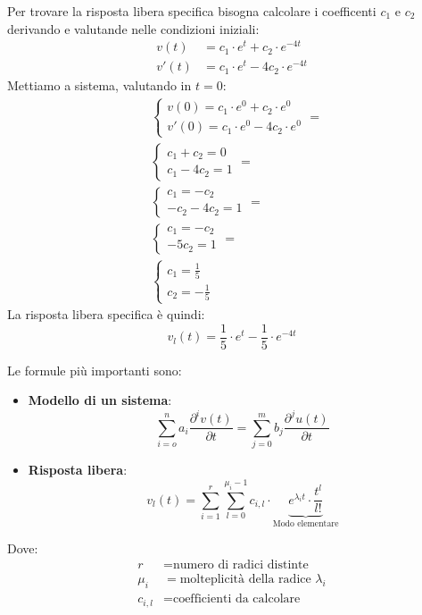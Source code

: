 \documentclass[a4paper]{article}
\begin{document}
\begin{example}
  \vspace{1em}
  \noindent
  Per trovare la risposta libera specifica bisogna calcolare i coefficenti \( c_1 \) e \( c_2 \)
  derivando e valutande nelle condizioni iniziali:
  \[
    \begin{aligned}
      v(t)  &= c_1 \cdot e^{t} + c_2 \cdot e^{-4t}\\
      v'(t) &= c_1 \cdot e^{t} - 4c_2 \cdot e^{-4t}
  \end{aligned}
  \] 
  Mettiamo a sistema, valutando in \( t = 0 \):
  \[
    \begin{aligned}
      &\begin{cases}
        v(0) = c_1 \cdot e^0 + c_2 \cdot e^0\\
        v'(0) = c_1 \cdot e^0 - 4c_2 \cdot e^0
      \end{cases}
      =\\
      &\begin{cases}
        c_1 + c_2 = 0\\
        c_1 - 4c_2 = 1
      \end{cases}
      =\\
      &\begin{cases}
        c_1 = -c_2\\
        -c_2 - 4c_2 = 1
      \end{cases}
      =\\
      &\begin{cases}
        c_1 = -c_2\\
        -5c_2 = 1
      \end{cases}
      =\\
      &\begin{cases}
        c_1 = \frac{1}{5}\\
        c_2 = -\frac{1}{5}
      \end{cases}
    \end{aligned}
  \] 
  La risposta libera specifica è quindi:
  \[
    v_l(t) = \frac{1}{5} \cdot e^t - \frac{1}{5} \cdot e^{-4t}
  \] 
\end{example}

\begin{definition}
  Le formule più importanti sono:
  \begin{itemize}
    \item \textbf{Modello di un sistema}:
      \[
        \sum_{i=o}^{n} a_i \frac{\partial^{i} v(t)}{\partial t} =
        \sum_{j=0}^{m} b_j \frac{\partial^{j} u(t)}{\partial t}
      \] 

    \item \textbf{Risposta libera}:
      \[
        v_l(t) = \sum_{i=1}^{r} \sum_{l=0}^{\mu_i -1} c_{i,l} \cdot \underbrace{
        e^{\lambda_i t} \cdot \frac{t^l}{l!}}_{\text{Modo elementare}}
      \] 
  \end{itemize}
  Dove:
  \[
  \begin{aligned}
    r &= \text{numero di radici distinte}\\
    \mu_i &= \text{molteplicità della radice } \lambda_i\\
    c_{i,l} &= \text{coefficienti da calcolare}
  \end{aligned}
  \] 
\end{definition}
\end{document}
